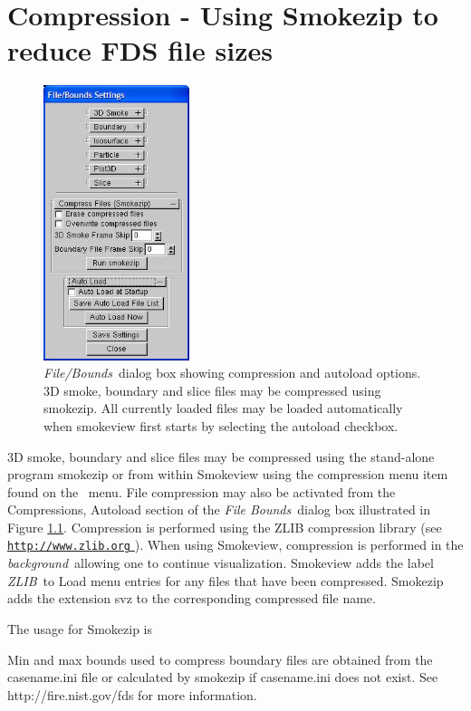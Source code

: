 \documentclass[11pt,twoside]{book}
\newcommand{\figoptions}{hbp}
\newcommand{\hhref}[1]{\href{#1}{{\tt #1}
}}
\newcommand{\frameit}[1]{\fbox{\tt #1}}
\begin{document}
\chapter{Compression - Using Smokezip to reduce FDS file sizes}

\begin{figure}[\figoptions]
\centerline{\includegraphics[width=1.6736in]{figures/figBOUND1} }
\caption[{\em Compress Files}\ and {\em Autoload}\ dialog box.] {{\em File/Bounds}\ dialog
box showing compression and autoload options.  3D smoke,  boundary and slice
files may be compressed using smokezip.  All currently loaded
files may be loaded automatically when smokeview first starts by
selecting the autoload checkbox.} \label{figBOUNDScompress}
\end{figure}

3D smoke, boundary and slice files may be compressed using the
stand-alone program smokezip or from within Smokeview using the
compression menu item found on the \frameit{Load/Unload}\ menu.  File
compression may also be activated from the Compressions, Autoload
section of the {\em File Bounds}\ dialog box illustrated in Figure
\ref{figBOUNDScompress}. Compression is performed using the ZLIB
compression library (see \hhref{http://www.zlib.org}). When using
Smokeview, compression is performed in the {\em background}\
allowing one to continue visualization.  Smokeview adds the label
{\em ZLIB}\ to Load menu entries for any files that have been
compressed. Smokezip adds the extension svz to the corresponding
compressed file name.

The usage for Smokezip is
{
\scriptsize

}

Min and max bounds used to compress boundary files are obtained
from the casename.ini file or calculated by smokezip if casename.ini
does not exist.  See http://fire.nist.gov/fds for more information.
\end{document}
